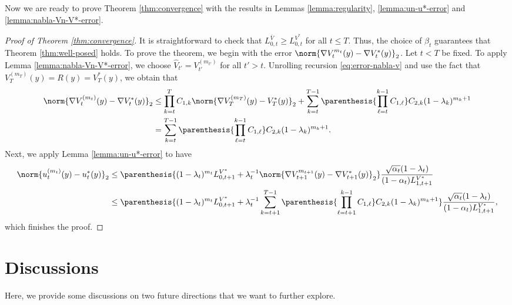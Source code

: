 \documentclass{article}
\begin{document}
Now we are ready to prove Theorem \ref{thm:convergence} with the results in Lemmas \ref{lemma:regularity}, \ref{lemma:un-u*-error} and \ref{lemma:nabla-Vn-V*-error}.
\begin{proof}[Proof of Theorem \ref{thm:convergence}]
It is straightforward to check that $L_{0, t}^{\bar{V}} \geq L_{0, t}^{V^*}$ for all $t \leq T$. Thus, the choice of $\beta_t$ guarantees that Theorem \ref{thm:well-posed} holds. To prove the theorem, we begin with the error $\norm{\nabla V_t^{m_t}(y) - \nabla V_t^{*}(y)}_2$. Let $t < T$ be fixed. To apply Lemma \ref{lemma:nabla-Vn-V*-error}, we choose $\widehat{V}_{t'} = V_{t'}^{(m_{t'})}$ for all $t' > t$. Unrolling recursion \eqref{eq:error-nabla-v} and use the fact that $V_T^{(m_T)}(y) = R(y) = V_T^*(y)$, we obtain that
\begin{align*}
    \norm{\nabla V_t^{(m_t)}(y) - \nabla V_t^{*}(y)}_2 & \leq \prod_{k = t}^{T}C_{1, k}\norm{\nabla V_T^{(m_T)}(y) - V_T^{*}(y)}_2 + \sum_{k = t}^{T - 1} \parenthesis{\prod_{\ell = t}^{k - 1}C_{1, \ell}} C_{2, k} (1 - \lambda_k)^{m_k + 1} \\ & = \sum_{k = t}^{T - 1} \parenthesis{\prod_{\ell = t}^{k - 1}C_{1, \ell}} C_{2, k} (1 - \lambda_k)^{m_k + 1}.
\end{align*}
Next, we apply Lemma \ref{lemma:un-u*-error} to have
\begin{align*}
    \norm{u_t^{(m_t)}(y) - u_t^*(y)}_2 & \leq  \parenthesis{(1 - \lambda_t)^{m_t}  L_{0,t+1}^{V^*} + \lambda_t^{-1}\norm{\nabla V_{t+1}^{m_{t+1}}(y) - \nabla V_{t+1}^{*}(y)}_2}  \frac{\sqrt{\alpha_{t}}(1 - \lambda_t)}{(1 - \alpha_{t})L_{1, t+1}^{V^*}}  \\ & \leq \parenthesis{(1 - \lambda_t)^{m_t}  L_{0,t+1}^{V^*} + \lambda_t^{-1}\sum_{k = t+1}^{T - 1} \parenthesis{\prod_{\ell = t+1}^{k - 1}C_{1, \ell}} C_{2, k} (1 - \lambda_k)^{m_k + 1}}  \frac{\sqrt{\alpha_{t}}(1 - \lambda_t)}{(1 - \alpha_{t})L_{1, t+1}^{V^*}},
\end{align*}
which finishes the proof. 


\end{proof}

\section{Discussions}\label{sec:discussion}
Here, we provide some discussions on two future directions that we want to further explore.
\end{document}

